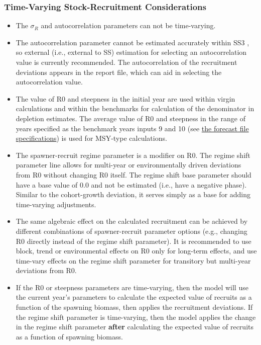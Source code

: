 \hypertarget{tv-sr}{}
\subsubsection{Time-Varying Stock-Recruitment Considerations}
\begin{itemize}
	
	\item The $\sigma_R$ and autocorrelation parameters can not be time-varying. 
	
	\item The autocorrelation parameter cannot be estimated accurately within SS3 \citep{johnson-can-2016}, so external (i.e., external to SS) estimation for selecting an autocorrelation value is currently recommended. The autocorrelation of the recruitment deviations appears in the report file, which can aid in selecting the autocorrelation value.
		
	\item The value of R0 and steepness in the initial year are used within virgin calculations and within the benchmarks for calculation of the denominator in depletion estimates. The average value of R0 and steepness in the range of years specified as the benchmark years inputs 9 and 10 (see \hyperlink{fore-specify}{the forecast file specifications}) is used for MSY-type calculations. 
	
	\item The spawner-recruit regime parameter is a modifier on R0. The regime shift parameter line allows for multi-year or environmentally driven deviations from R0 without changing R0 itself. The regime shift base parameter should have a base value of 0.0 and not be estimated (i.e., have a negative phase). Similar to the cohort-growth deviation, it serves simply as a base for adding time-varying adjustments.
	
	\item The same algebraic effect on the calculated recruitment can be achieved by different combinations of spawner-recruit parameter options (e.g., changing R0 directly instead of the regime shift parameter). It is recommended to use block, trend or environmental effects on R0 only for long-term effects, and use time-vary effects on the regime shift parameter for transitory but multi-year deviations from R0.	
	
	\item If the R0 or steepness parameters are time-varying, then the model will use the current year's parameters to calculate the expected value of recruits as a function of the spawning biomass, then applies the recruitment deviations. If the regime shift parameter is time-varying, then the model applies the change in the regime shift parameter \textbf{after} calculating the expected value of recruits as a function of spawning biomass.

\end{itemize}


